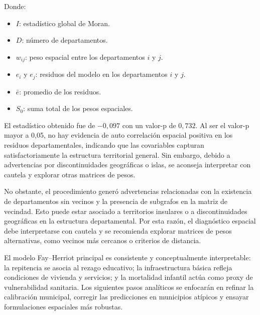 Donde:
\begin{itemize}
    \item $I$: estadístico global de Moran.
    \item $D$: número de departamentos.
    \item $w_{ij}$: peso espacial entre los departamentos $i$ y $j$.
    \item $e_i$ y $e_j$: residuos del modelo en los departamentos $i$ y $j$.
    \item $\bar{e}$: promedio de los residuos.
    \item $S_0$: suma total de los pesos espaciales.
\end{itemize}

El estadístico obtenido fue de $-0,097$ con un valor-p de $0,732$. Al ser el valor-p mayor a 0,05, no hay evidencia de auto correlación espacial positiva en los residuos departamentales, indicando que las covariables capturan satisfactoriamente la estructura territorial general. Sin embargo, debido a advertencias por discontinuidades geográficas o islas, se aconseja interpretar con cautela y explorar otras matrices de pesos.

No obstante, el procedimiento generó advertencias relacionadas con la existencia de departamentos sin vecinos y la presencia de subgrafos en la matriz de vecindad. Esto puede estar asociado a territorios insulares o a discontinuidades geográficas en la estructura departamental. Por esta razón, el diagnóstico espacial debe interpretarse con cautela y se recomienda explorar matrices de pesos alternativas, como vecinos más cercanos o criterios de distancia.

El modelo Fay–Herriot principal es consistente y conceptualmente interpretable: la repitencia se asocia al rezago educativo; la infraestructura básica refleja condiciones de vivienda y servicios; y la mortalidad infantil actúa como proxy de vulnerabilidad sanitaria. Los siguientes pasos analíticos se enfocarán en refinar la calibración municipal, corregir las predicciones en municipios atípicos y ensayar formulaciones espaciales más robustas.

   

   


